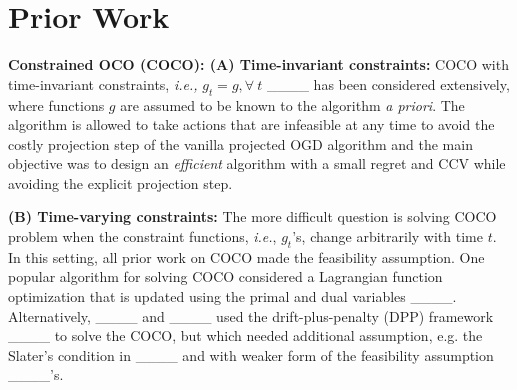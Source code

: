 \section{Prior Work}
{\bf Constrained OCO (COCO): (A) Time-invariant constraints:} COCO with time-invariant constraints, \emph{i.e.,} $g_{t} = g, \forall \ t$ ____ has been considered extensively, where functions $g$ are assumed to be known to the algorithm \emph{a priori}. The algorithm is allowed to take actions that are infeasible at any time to avoid the costly projection step of the vanilla projected OGD algorithm and the main objective was to design an \emph{efficient} algorithm  with a small regret and CCV while avoiding  the explicit projection step. 

{\bf (B) Time-varying constraints:} The more difficult question is solving COCO problem when the constraint functions, \emph{i.e.}, $g_{t}$'s, change arbitrarily with time $t$.  
In this setting, all prior work on COCO made the feasibility assumption.
One popular algorithm for solving COCO considered a Lagrangian function optimization that is updated using the primal and dual variables ____. Alternatively, ____ and ____ used the drift-plus-penalty (DPP) framework  ____ to solve the COCO, but which needed additional assumption, e.g. the Slater's condition in ____ and with weaker form of the feasibility assumption ____'s. 


